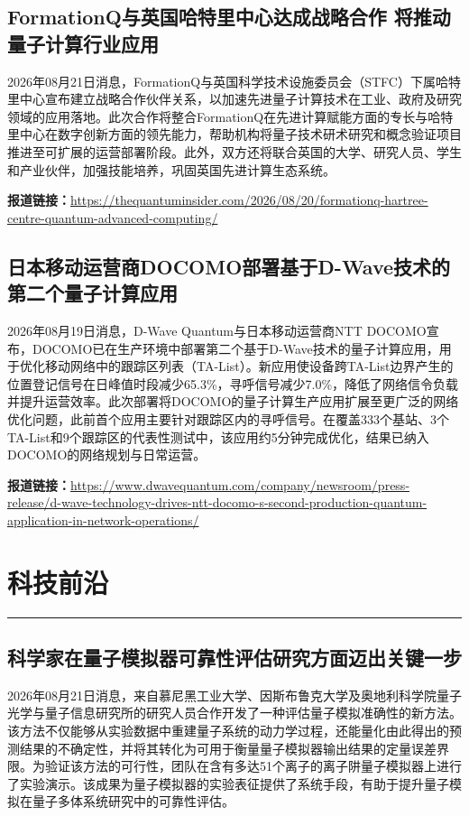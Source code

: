 \documentclass[12pt,a4paper]{ctexart}
\begin{document}
\subsection{ FormationQ与英国哈特里中心达成战略合作 将推动量子计算行业应用 }

2026年08月21日消息，FormationQ与英国科学技术设施委员会（STFC）下属哈特里中心宣布建立战略合作伙伴关系，以加速先进量子计算技术在工业、政府及研究领域的应用落地。此次合作将整合FormationQ在先进计算赋能方面的专长与哈特里中心在数字创新方面的领先能力，帮助机构将量子技术研术研究和概念验证项目推进至可扩展的运营部署阶段。此外，双方还将联合英国的大学、研究人员、学生和产业伙伴，加强技能培养，巩固英国先进计算生态系统。

\noindent\textbf{报道链接：}\url{https://thequantuminsider.com/2026/08/20/formationq-hartree-centre-quantum-advanced-computing/}

\subsection{ 日本移动运营商DOCOMO部署基于D-Wave技术的第二个量子计算应用 }

2026年08月19日消息，D-Wave Quantum与日本移动运营商NTT DOCOMO宣布，DOCOMO已在生产环境中部署第二个基于D-Wave技术的量子计算应用，用于优化移动网络中的跟踪区列表（TA-List）。新应用使设备跨TA-List边界产生的位置登记信号在日峰值时段减少65.3\%，寻呼信号减少7.0\%，降低了网络信令负载并提升运营效率。此次部署将DOCOMO的量子计算生产应用扩展至更广泛的网络优化问题，此前首个应用主要针对跟踪区内的寻呼信号。在覆盖333个基站、3个TA-List和9个跟踪区的代表性测试中，该应用约5分钟完成优化，结果已纳入DOCOMO的网络规划与日常运营。

\noindent\textbf{报道链接：}\url{https://www.dwavequantum.com/company/newsroom/press-release/d-wave-technology-drives-ntt-docomo-s-second-production-quantum-application-in-network-operations/}


\newpage
\section{科技前沿}
\vspace{-0.5em}
\noindent\rule{\linewidth}{1.5pt}

\subsection{ 科学家在量子模拟器可靠性评估研究方面迈出关键一步 }

2026年08月21日消息，来自慕尼黑工业大学、因斯布鲁克大学及奥地利科学院量子光学与量子信息研究所的研究人员合作开发了一种评估量子模拟准确性的新方法。该方法不仅能够从实验数据中重建量子系统的动力学过程，还能量化由此得出的预测结果的不确定性，并将其转化为可用于衡量量子模拟器输出结果的定量误差界限。为验证该方法的可行性，团队在含有多达51个离子的离子阱量子模拟器上进行了实验演示。该成果为量子模拟器的实验表征提供了系统手段，有助于提升量子模拟在量子多体系统研究中的可靠性评估。
\end{document}
